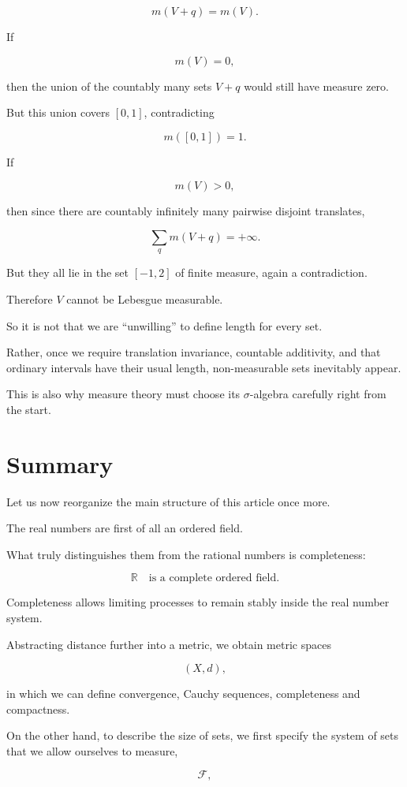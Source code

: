 \documentclass[11pt]{article}
\begin{document}
\[
m(V+q)=m(V).
\]

If

\[
m(V)=0,
\]

then the union of the countably many sets $V+q$ would still have measure zero.

But this union covers $[0,1]$, contradicting

\[
m([0,1])=1.
\]

If

\[
m(V)>0,
\]

then since there are countably infinitely many pairwise disjoint translates,

\[
\sum_{q}m(V+q)=+\infty.
\]

But they all lie in the set $[-1,2]$ of finite measure, again a contradiction.

Therefore $V$ cannot be Lebesgue measurable.

So it is not that we are ``unwilling'' to define length for every set.

Rather, once we require translation invariance, countable additivity, and that ordinary intervals have their usual length, non-measurable sets inevitably appear.

This is also why measure theory must choose its $\sigma$-algebra carefully right from the start.

\section*{Summary}

Let us now reorganize the main structure of this article once more.

The real numbers are first of all an ordered field.

What truly distinguishes them from the rational numbers is completeness:

\[
\mathbb{R}\quad\text{is a complete ordered field}.
\]

Completeness allows limiting processes to remain stably inside the real number system.

Abstracting distance further into a metric, we obtain metric spaces

\[
(X,d),
\]

in which we can define convergence, Cauchy sequences, completeness and compactness.

On the other hand, to describe the size of sets, we first specify the system of sets that we allow ourselves to measure,

\[
\mathcal{F},
\]
\end{document}
